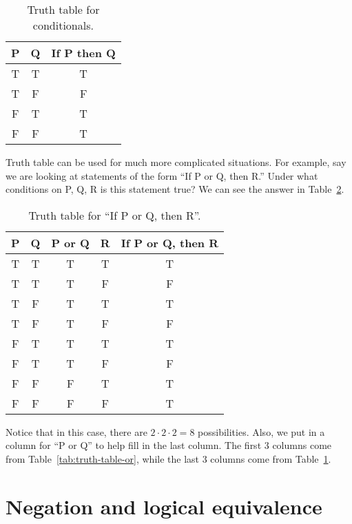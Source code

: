 \documentclass{tufte-book}
\begin{document}
\begin{table}
  \centering
  \begin{tabular}{ccc}
    \toprule
    P & Q & If P then Q \\ \midrule
    T & T & T \\
    T & F & F \\
    F & T & T \\
    F & F & T \\ \bottomrule
  \end{tabular}
  \caption{Truth table for conditionals.}
  \label{tab:truth-table-conditionals}
\end{table}
Truth table can be used for much more complicated situations. For example, say we are looking at statements of the form ``If P or Q, then R.'' Under what conditions on P, Q, R is this statement true? We can see the answer in Table~\ref{tab:truth-table-if-p-or-q-then-r}.

\begin{table}
  \centering
  \begin{tabular}{ccccc}
    \toprule
    P & Q & P or Q & R & If P or Q, then R \\ \midrule
    T & T & T & T & T\\
    T & T & T & F & F\\
    T & F & T & T & T\\
    T & F & T & F & F\\ 
    F & T & T & T & T \\
    F & T & T & F & F \\
    F & F & F & T & T \\
    F & F & F & F & T \\
    \bottomrule
  \end{tabular}
  \caption{Truth table for ``If P or Q, then R''.}
  \label{tab:truth-table-if-p-or-q-then-r}
\end{table}
Notice that in this case, there are $2 \cdot 2 \cdot 2 = 8$ possibilities. Also, we put in a column for ``P or Q'' to help fill in the last column. The first 3 columns come from Table~\ref{tab:truth-table-or}, while the last 3 columns come from Table~\ref{tab:truth-table-conditionals}.



\section{Negation and logical equivalence}
\label{sec:negat-logic-equiv}
\end{document}
